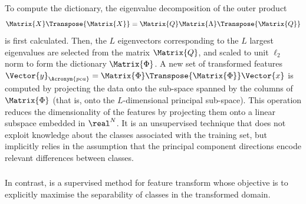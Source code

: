 \documentclass{article}
\def \nComponents{L} 	%
\def \fea{\Vector{x}} 	%
\def \nDim{N} 			%
\def \newFea{\Vector{y}} 	%
\def \Dic{\Matrix{\Phi}} %
\begin{document}
To compute the dictionary, the eigenvalue decomposition of the outer product
\begin{equation}
\Matrix{X}\Transpose{\Matrix{X}} = \Matrix{Q}\Matrix{\Lambda}\Transpose{\Matrix{Q}}
\end{equation}
is first calculated. Then, the $\nComponents$ eigenvectors corresponding to the $\nComponents$ largest eigenvalues are selected from the matrix $\Matrix{Q}$, and scaled to unit $\ell_{2}$ norm to form the dictionary $\Dic$. A new set of transformed features $\newFea_{\Acronym{pca}} = \Dic\Transpose{\Dic}\fea$ is computed by projecting the data onto the sub-space spanned by the columns of $\Dic$ (that is, onto the $\nComponents$-dimensional principal sub-space). This operation reduces the dimensionality of the features by projecting them onto a linear subspace embedded in $\real^{\nDim}$. It is an unsupervised technique that does not exploit knowledge about the classes associated with the training set, but implicitly relies in the assumption that the principal component directions encode relevant differences between classes.

\subsubsection{}
In contrast,  is a supervised method for feature transform whose objective is to explicitly maximise the separability of classes in the transformed domain. 
\end{document}
